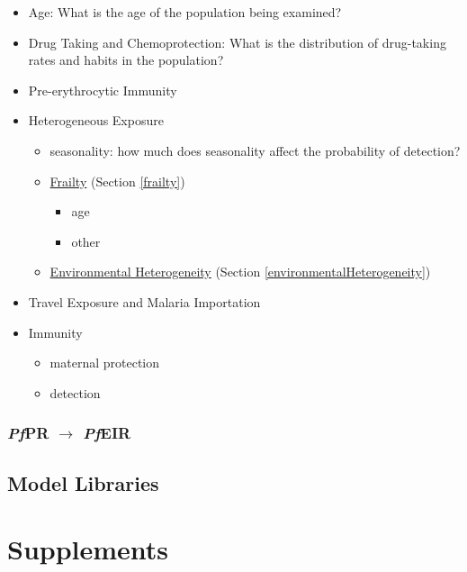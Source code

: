 \documentclass[
]{book}
\begin{document}
\begin{itemize}
\item
  Age: What is the age of the population being examined?
\item
  Drug Taking and Chemoprotection: What is the distribution of drug-taking rates and habits in the population?
\item
  Pre-erythrocytic Immunity
\item
  Heterogeneous Exposure

  \begin{itemize}
  \item
    seasonality: how much does seasonality affect the probability of detection?
  \item
    \protect\hyperlink{frailty}{Frailty} (Section \ref{frailty})

    \begin{itemize}
    \item
      age
    \item
      other
    \end{itemize}
  \item
    \protect\hyperlink{environmentalHeterogeneity}{Environmental Heterogeneity} (Section \ref{environmentalHeterogeneity})
  \end{itemize}
\item
  Travel Exposure and Malaria Importation
\item
  Immunity

  \begin{itemize}
  \item
    maternal protection
  \item
    detection
  \end{itemize}
\end{itemize}

\hypertarget{pr2eir}{%
\section{\texorpdfstring{\emph{Pf}PR \(\rightarrow\) \emph{Pf}EIR}{PfPR \textbackslash rightarrow PfEIR}}\label{pr2eir}}

\hypertarget{model-libraries}{%
\chapter{Model Libraries}\label{model-libraries}}

\hypertarget{part-supplements}{%
\part{Supplements}\label{part-supplements}}
\end{document}
